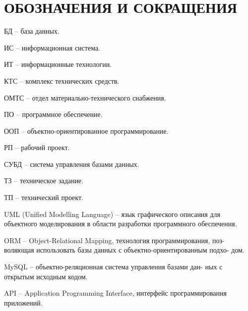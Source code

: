 \section*{ОБОЗНАЧЕНИЯ И СОКРАЩЕНИЯ}

БД -- база данных.

ИС -- информационная система.

ИТ -- информационные технологии. 

КТС -- комплекс технических средств.

ОМТС -- отдел материально-технического снабжения. 

ПО -- программное обеспечение.

ООП -- объектно-ориентированное программирование.

РП -- рабочий проект.

СУБД -- система управления базами данных.

ТЗ -- техническое задание.

ТП -- технический проект.

UML (Unified Modelling Language) -- язык графического описания для объектного моделирования в области разработки программного обеспечения.

ORM --  Object-Relational Mapping, технология программирования, поз-
воляющая использовать базы данных с объектно-ориентированным подхо-
дом.

MySQL -- объектно-реляционная система управления базами дан-
ных с открытым исходным кодом.

API -- Application Programming Interface, интерфейс программирования
приложений.
